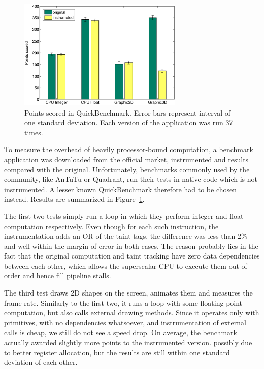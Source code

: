\documentclass[12pt,twoside,notitlepage]{report}
\begin{document}
\begin{figure}
	\centerline{
		\includegraphics[width=0.7\textwidth]{figs/fig_eval_quickbench.eps}
	}
	\caption{Points scored in QuickBenchmark. Error bars represent interval of one standard deviation. Each version of the application was run 37 times.}
	\label{figure:Evalutaion_QuickBench}
\end{figure}

To measure the overhead of heavily processor-bound computation, a benchmark application was downloaded from the official market, instrumented and results compared with the original. Unfortunately, benchmarks commonly used by the community, like AnTuTu or Quadrant, run their tests in native code which is not instrumented. A lesser known QuickBenchmark therefore had to be chosen instead. Results are summarized in Figure~\ref{figure:Evalutaion_QuickBench}. 

The first two tests simply run a loop in which they perform integer and float computation respectively. Even though for each such instruction, the instrumentation adds an OR of the taint tags, the difference was less than 2\% and well within the margin of error in both cases. The reason probably lies in the fact that the original computation and taint tracking have zero data dependencies between each other, which allows the superscalar CPU to execute them out of order and hence fill pipeline stalls.

The third test draws 2D shapes on the screen, animates them and measures the frame rate. Similarly to the first two, it runs a loop with some floating point computation, but also calls external drawing methods. Since it operates only with primitives, with no dependencies whatsoever, and instrumentation of external calls is cheap, we still do not see a speed drop. On average, the benchmark actually awarded slightly more points to the instrumented version. possibly due to better register allocation, but the results are still within one standard deviation of each other. 
\end{document}
